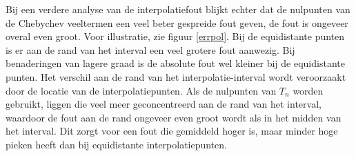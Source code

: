 \documentclass[a4paper, 12pt, titlepage]{report}
\begin{document}
 Bij een verdere analyse van de interpolatiefout blijkt echter dat de nulpunten van de Chebychev veeltermen een veel beter gespreide fout geven, de fout is ongeveer overal even groot. Voor illustratie, zie figuur \ref{errpol}. Bij de equidistante punten is er aan de rand van het interval een veel grotere fout aanwezig. Bij benaderingen van lagere graad is de absolute fout wel kleiner bij de equidistante punten. Het verschil aan de rand van het interpolatie-interval wordt veroorzaakt door de locatie van de interpolatiepunten. Als de nulpunten van $T_n$ worden gebruikt, liggen die veel meer geconcentreerd aan de rand van het interval, waardoor de fout aan de rand ongeveer even groot wordt als in het midden van het interval. Dit zorgt voor een fout die gemiddeld hoger is, maar minder hoge pieken heeft dan bij equidistante interpolatiepunten.\\
\end{document}
